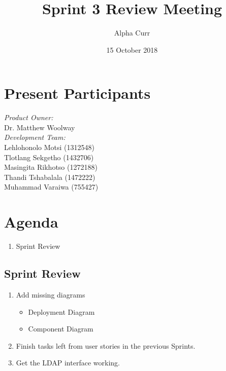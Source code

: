 \documentclass[11pt]{article}
\title{Sprint 3 Review Meeting}
\author{Alpha Curr}
\date{15 October 2018}
\begin{document}
\maketitle

\section{Present Participants}
\textit{Product Owner:}\\
Dr. Matthew Woolway\\
\newline
\textit{Development Team:}\\
Lehlohonolo Motsi (1312548)\\
Tlotlang Sekgetho (1432706)\\
Masingita Rikhotso (1272188)\\
Thandi Tshabalala (1472222)\\
Muhammad Varaiwa (755427)\\

\section{Agenda}
\begin{enumerate}
\item Sprint Review
\end{enumerate}

\subsection{Sprint Review}
\begin{enumerate}[nosep, label=\textendash]
	\item Add missing diagrams
		\begin{itemize}
		\item Deployment Diagram
		\item Component Diagram
		\end{itemize}
	\item Finish tasks left from user stories in the previous Sprints.
	\item Get the LDAP interface working.
	
\end{enumerate}
\end{document}
